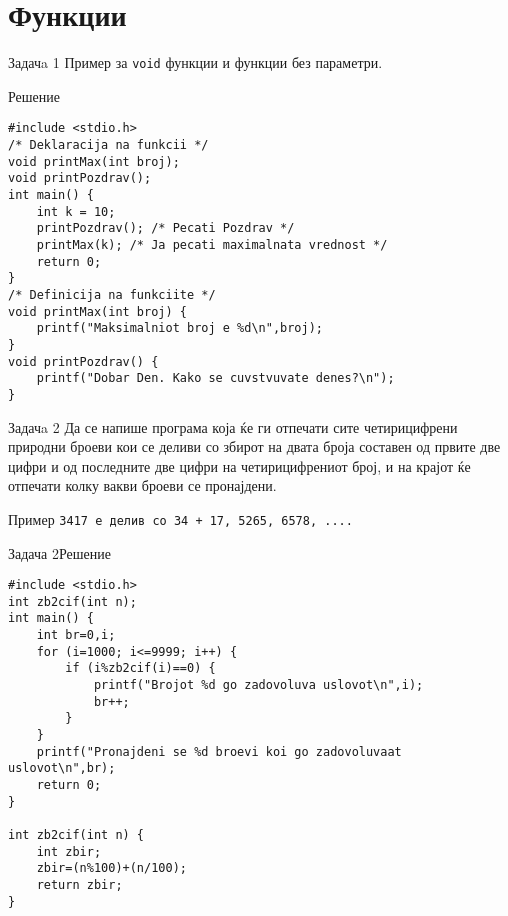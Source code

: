 
\section{Функции}
\begin{frame}[fragile]{Задачa 1}
Пример за \texttt{void} функции и функции без параметри.
\pause
\begin{exampleblock}{Решение}
    \begin{lstlisting}
#include <stdio.h>
/* Deklaracija na funkcii */
void printMax(int broj);
void printPozdrav();
int main() {
    int k = 10;
    printPozdrav(); /* Pecati Pozdrav */
    printMax(k); /* Ja pecati maximalnata vrednost */
    return 0;
}
/* Definicija na funkciite */
void printMax(int broj) {
    printf("Maksimalniot broj e %d\n",broj);
}
void printPozdrav() {
    printf("Dobar Den. Kako se cuvstvuvate denes?\n");
}
\end{lstlisting}
\end{exampleblock}
\end{frame}


\begin{frame}[fragile]{Задачa 2}
Да се напише програма која ќе ги отпечати сите четирицифрени природни броеви кои се деливи со збирот на двата броја 
составен од првите две цифри и од последните две цифри на четирицифрениот број,
и на крајот ќе отпечати колку вакви броеви се пронајдени.\\
\begin{exampleblock}{Пример}
\texttt{3417 е делив со 34 + 17, 5265, 6578, ....}\\
\end{exampleblock}
\end{frame}

\begin{frame}[fragile]{Задача 2}{Решение}
\begin{lstlisting}
#include <stdio.h>
int zb2cif(int n);
int main() {
    int br=0,i;
    for (i=1000; i<=9999; i++) {
        if (i%zb2cif(i)==0) {
            printf("Brojot %d go zadovoluva uslovot\n",i);
            br++;
        }
    }
    printf("Pronajdeni se %d broevi koi go zadovoluvaat uslovot\n",br);
    return 0;
}

int zb2cif(int n) {
    int zbir;
    zbir=(n%100)+(n/100);
    return zbir;
}
\end{lstlisting}
\end{frame}

